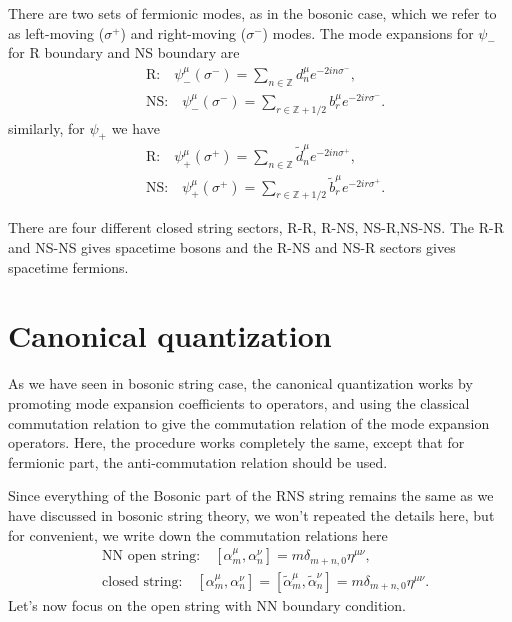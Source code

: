\documentclass[graybox,envcountchap,sectrefs]{svmono}
\begin{document}
There are two sets of fermionic modes, as  in the bosonic case, which we refer to as left-moving ($\sigma^+$) and right-moving ($\sigma^-$) modes. The mode expansions for $\psi_{-}$ for R boundary and NS boundary are
\begin{align}
&\text{R:}\quad \psi^{\mu}_{-}(\sigma^-)=\sum_{n\in\mathbb{Z}}d_n^{\mu}e^{-2in\sigma^-},	\\
&\text{NS:}\quad \psi^{\mu}_{-}(\sigma^-)=\sum_{r\in\mathbb{Z}+1/2}b_r^{\mu}e^{-2ir\sigma^-}.
\end{align}
similarly, for $\psi_+$ we have
\begin{align}
&\text{R:}\quad \psi^{\mu}_{+}(\sigma^+)=\sum_{n\in\mathbb{Z}}\tilde{d}_n^{\mu}e^{-2in\sigma^+},	\\
&\text{NS:}\quad \psi^{\mu}_{+}(\sigma^+)=\sum_{r\in\mathbb{Z}+1/2}\tilde{b}_r^{\mu}e^{-2ir\sigma^+}.
\end{align}

There are four different closed string sectors, R-R, R-NS, NS-R,NS-NS. The R-R and NS-NS gives spacetime bosons and the R-NS and NS-R sectors gives spacetime fermions.


\section{Canonical quantization}
As we have seen in bosonic string case, the canonical quantization works by promoting mode expansion coefficients to operators, and using the classical commutation relation to give the commutation relation of the mode expansion operators. Here, the procedure works completely the same, except that for fermionic part, the anti-commutation relation should be used.

Since everything of the Bosonic part of the RNS string remains the same as we have discussed in bosonic string theory, we won't repeated the details here, but for convenient, we write down the commutation relations here
\begin{align}
&\text{NN open string:}\quad [\alpha_m^{\mu},\alpha_n^{\nu}]=m\delta_{m+n,0}\eta^{\mu\nu},\\
&\text{closed string:}\quad [\alpha_m^{\mu},\alpha_n^{\nu}]=[\tilde{\alpha}_m^{\mu},\tilde{\alpha}_n^{\nu}]=m\delta_{m+n,0}\eta^{\mu\nu}.
\end{align}
Let's now focus on the open string with NN boundary condition.
\end{document}
